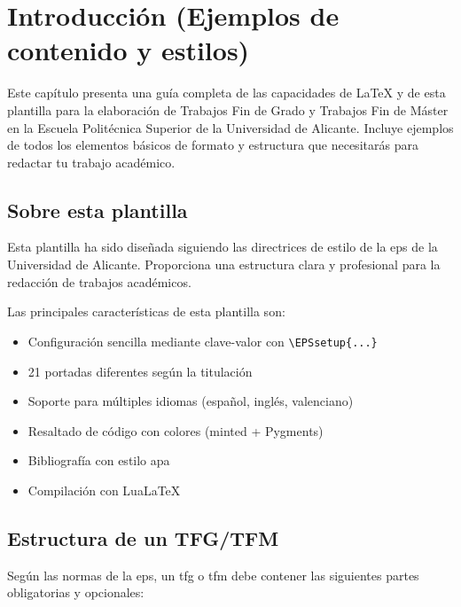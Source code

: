\chapter{Introducción (Ejemplos de contenido y estilos)}
\label{chap:introduccion}

Este capítulo presenta una guía completa de las capacidades de \LaTeX{} y de esta
plantilla para la elaboración de Trabajos Fin de Grado y Trabajos Fin de Máster
en la Escuela Politécnica Superior de la Universidad de Alicante. Incluye ejemplos
de todos los elementos básicos de formato y estructura que necesitarás para
redactar tu trabajo académico.

\section{Sobre esta plantilla}
\label{sec:sobre-plantilla}

Esta plantilla ha sido diseñada siguiendo las directrices de estilo de la \gls{eps} de la Universidad de Alicante. Proporciona una estructura clara y profesional para la redacción de trabajos académicos.

Las principales características de esta plantilla son:

\begin{itemize}
  \item Configuración sencilla mediante clave-valor con \verb|\EPSsetup{...}|
  \item 21 portadas diferentes según la titulación
  \item Soporte para múltiples idiomas (español, inglés, valenciano)
  \item Resaltado de código con colores (minted + Pygments)
  \item Bibliografía con estilo \gls{apa}
  \item Compilación con LuaLaTeX
\end{itemize}

\section{Estructura de un TFG/TFM}
\label{sec:estructura-tfg}

Según las normas de la \gls{eps}, un \gls{tfg} o \gls{tfm} debe contener
las siguientes partes obligatorias y opcionales:

